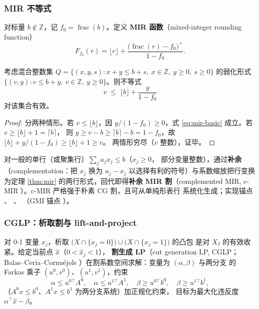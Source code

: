 \subsubsection{MIR 不等式}

\begin{definition}[MIR 函数]
对标量 $b \notin \mathbb{Z}$，记 $f_0 = \operatorname{frac}(b)$。定义
\textbf{MIR 函数}（mixed-integer rounding function）
\[
F_{f_0}(r) = \lfloor r \rfloor + \frac{\big(\operatorname{frac}(r) - f_0\big)^+}{1 - f_0}.
\]
\end{definition}

\begin{theorem}
\label{thm:mir}
考虑混合整数集
$Q = \{(x, y, s) : x + y \le b + s,\ x \in \mathbb{Z},\ y \ge 0,\ s \ge 0\}$
的弱化形式
$\{(v, y) : v \le b + y,\ v \in \mathbb{Z},\ y \ge 0\}$。则不等式
\begin{equation}
\label{eq:mir-basic}
v \;\le\; \lfloor b \rfloor + \frac{y}{1 - f_0}
\end{equation}
对该集合有效。
\end{theorem}
\begin{proof}
分两种情形。若 $v \le \lfloor b \rfloor$，因 $y/(1-f_0) \ge 0$，式
\eqref{eq:mir-basic} 成立。若 $v \ge \lfloor b \rfloor + 1 = \lceil b\rceil$，
则 $y \ge v - b \ge \lceil b \rceil - b = 1 - f_0$，故
$\lfloor b\rfloor + y/(1-f_0) \ge \lfloor b\rfloor + 1 \ge v$。
两情形穷尽（$v$ 整数），证毕。
\end{proof}

对一般的单行（或聚集行）$\sum_j a_j x_j \le b$（$x_j \ge 0$，
部分变量整数），通过\textbf{补余}（complementation：把 $x_j$ 换为
$u_j - x_j$ 以选择有利的符号）与系数缩放把行变换为定理 \ref{thm:mir}
的两行形式，回代即得\textbf{补余 MIR 割}（complemented MIR,
c-MIR \cite{marchand2001}）。c-MIR 严格强于朴素 CG 割，且可从单纯形表行
系统化生成；实现锚点
、
、
（GMI 锚点
）。

\subsubsection{CGLP：析取割与 lift-and-project}

\begin{definition}
对 0-1 变量 $x_j$，析取
$\big(X \cap \{x_j = 0\}\big) \cup \big(X \cap \{x_j = 1\}\big)$ 的凸包
是对 $X_I$ 的有效收紧。给定当前点 $\hat x$（$0 < \hat x_j < 1$），
\textbf{割生成 LP}（cut generation LP, CGLP；Balas--Ceria--Cornu\'ejols
\cite{balas1993}）在割系数空间求解：变量为 $(\alpha, \beta)$ 与两分支
的 Farkas 乘子 $(u^0, v^0)$、$(u^1, v^1)$，约束
\[
\alpha \le u^{0\top} A^{0},\quad \alpha \le u^{1\top} A^{1},\quad
\beta \ge u^{0\top} b^{0},\quad \beta \ge u^{1\top} b^{1},
\]
（$A^{0} x \le b^{0}$、$A^{1} x \le b^{1}$ 为两分支系统）加正规化约束，
目标为最大化违反度 $\alpha^\top \hat x - \beta$。
\end{definition}

